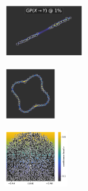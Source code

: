 \begin{figure}[H]
    \centering
    \begin{subfigure}
        \centering
        \includegraphics[width=0.388\textwidth,valign=t]{ood-detection/figures/ood-detection/confidence-line-gp-coarse-xy.pdf}
    \end{subfigure}
    \begin{subfigure}
        \centering
        \includegraphics[width=0.254\textwidth,valign=t]{ood-detection/figures/ood-detection/confidence-circle-gp-coarse-xy.pdf}
    \end{subfigure}
    \begin{subfigure}
        \centering
        \includegraphics[width=0.308\textwidth,valign=t]{ood-detection/figures/ood-detection/confidence-haystack-gp-coarse-xy.pdf}
    \end{subfigure}


\end{figure}
